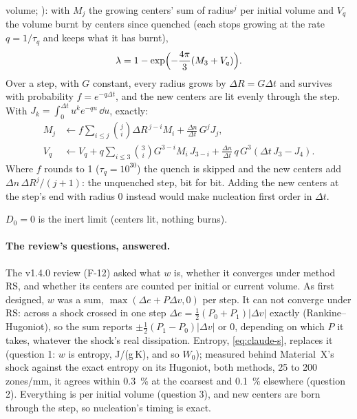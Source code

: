 \begin{enumerate}
  volume; \cite{farjas2006}): with $M_j$ the growing centers' sum of
  radius$^j$ per initial volume and $V_q$ the volume burnt by centers since
  quenched (each stops growing at the rate $q = 1/\tau_q$ and keeps what it
  has burnt),
  \begin{equation}
    \lambda = 1 - \exp\Bigl(-\frac{4\pi}{3}(M_3 + V_q)\Bigr).
    \label{eq:claude}
  \end{equation}
  Over a step, with $G$ constant, every radius grows by $\Delta R = G\Delta
  t$ and survives with probability $f = e^{-q\Delta t}$, and the new
  centers are lit evenly through the step. With $J_k = \int_0^{\Delta t}
  u^k e^{-qu}\,\dd u$, exactly:
  \begin{align}
    M_j &\leftarrow f\sum_{i \le j}\binom{j}{i}\Delta R^{\,j-i} M_i
          + \frac{\Delta n}{\Delta t}\,G^j J_j, \\
    V_q &\leftarrow V_q + q\sum_{i \le 3}\binom{3}{i} G^{3-i} M_i\,J_{3-i}
          + \frac{\Delta n}{\Delta t}\,q\,G^3(\Delta t\,J_3 - J_4).
  \end{align}
  Where $f$ rounds to 1 ($\tau_q = 10^{30}$) the quench is skipped and the
  new centers add $\Delta n\,\Delta R^j/(j+1)$: the unquenched step, bit for
  bit. Adding the new centers at the step's end with radius 0 instead would
  make nucleation first order in $\Delta t$.
\end{enumerate}
$D_0 = 0$ is the inert limit (centers lit, nothing burns).

\paragraph{The review's questions, answered.} The v1.4.0 review (F-12)
asked what $w$ is, whether it converges under method RS, and whether its
centers are counted per initial or current volume. As first designed, $w$
was a sum, $\max(\Delta e + P\Delta v, 0)$ per step. It can not converge
under RS: across a shock crossed in one step $\Delta e = \frac12(P_0 +
P_1)|\Delta v|$ exactly (Rankine--Hugoniot), so the sum reports $\pm\frac12(P_1
- P_0)|\Delta v|$ or 0, depending on which $P$ it takes, whatever the shock's
real dissipation. Entropy, \cref{eq:claude-s}, replaces it (question 1: $w$
is entropy, J/(g\,K), and so $W_0$); measured behind Material~X's shock
against the exact entropy on its Hugoniot, both methods, 25 to 200
zones/mm, it agrees within 0.3~\% at the coarsest and 0.1~\% elsewhere
(question 2). Everything is per initial volume (question 3), and new
centers are born through the step, so nucleation's timing is exact.

